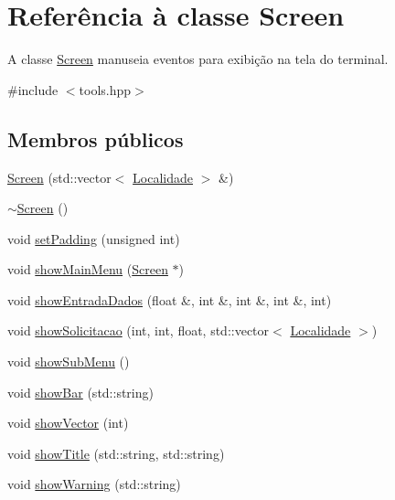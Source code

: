 \hypertarget{classScreen}{}\section{Referência à classe Screen}
\label{classScreen}


A classe \hyperlink{classScreen}{Screen} manuseia eventos para exibição na tela do terminal.  




{\ttfamily \#include $<$tools.\+hpp$>$}

\subsection*{Membros públicos}
\begin{DoxyCompactItemize}
\item 
\hyperlink{classScreen_ac7905724062398213802167f49dbe682}{Screen} (std\+::vector$<$ \hyperlink{classLocalidade}{Localidade} $>$ \&)
\item 
\hyperlink{classScreen_a4243bc17596af96415b09ac48205676d}{$\sim$\+Screen} ()
\item 
void \hyperlink{classScreen_a32771ff2a19f570bf35654e11971e938}{set\+Padding} (unsigned int)
\item 
void \hyperlink{classScreen_a3ea61b376ace3fa90b16ba31b01a8107}{show\+Main\+Menu} (\hyperlink{classScreen}{Screen} $\ast$)
\item 
void \hyperlink{classScreen_a7b425f6ea8830066c837f84e09f493a0}{show\+Entrada\+Dados} (float \&, int \&, int \&, int \&, int)
\item 
void \hyperlink{classScreen_a2f514fb5d139b0b6e8d67c95ee6a2596}{show\+Solicitacao} (int, int, float, std\+::vector$<$ \hyperlink{classLocalidade}{Localidade} $>$)
\item 
void \hyperlink{classScreen_ac974e1d0dc9ab1f4c9be2d8f70d763c7}{show\+Sub\+Menu} ()
\item 
void \hyperlink{classScreen_a16bd8465322e12b669e26ecccd4a3704}{show\+Bar} (std\+::string)
\item 
void \hyperlink{classScreen_aca2a46f65496651c74b66e807f7ed421}{show\+Vector} (int)
\item 
void \hyperlink{classScreen_aefbd91aee5978143823031767159caf7}{show\+Title} (std\+::string, std\+::string)
\item 
void \hyperlink{classScreen_a5fc8c4449368a8507f03bf3243677f1e}{show\+Warning} (std\+::string)
\end{DoxyCompactItemize}


